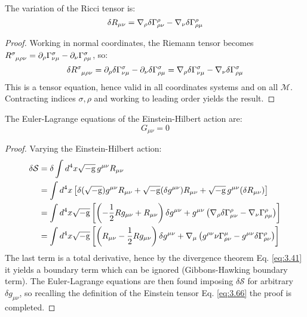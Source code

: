 \begin{lemma}
  The variation of the Ricci tensor is:
  \begin{equation}
    \delta R_{\mu \nu} = \nabla_\rho \delta \Gamma^\rho_{\rho \nu} - \nabla_\nu \delta \Gamma^\rho_{\rho \mu}
    \label{eq:4.4}
  \end{equation}
\end{lemma}
\begin{proof}
  Working in normal coordinates, the Riemann tensor becomes $ \tensor{R}{^\sigma_{\mu \rho \nu}} = \pa_\rho \Gamma^\sigma_{\nu \mu} - \pa_\nu \Gamma^\sigma_{\rho \mu} $, so:
  \begin{equation*}
    \delta \tensor{R}{^\sigma_{\mu \rho \nu}} = \pa_\rho \delta \Gamma^\sigma_{\nu \mu} - \pa_\nu \delta \Gamma^\sigma_{\rho \mu} = \na_\rho \delta \Gamma^\sigma_{\nu \mu} - \na_\nu \delta \Gamma^\sigma_{\rho \mu}
  \end{equation*}
  This is a tensor equation, hence valid in all coordinates systems and on all $ \mathcal{M} $. Contracting indices $ \sigma,\rho $ and working to leading order yields the result.
\end{proof}

\begin{proposition}\label{prop-einst-eq}
  The Euler-Lagrange equations of the Einstein-Hilbert action are:
  \begin{equation}
    G_{\mu \nu} = 0
    \label{eq:4.5}
  \end{equation}
\end{proposition}
\begin{proof}
  Varying the Einstein-Hilbert action:
  \begin{equation*}
    \begin{split}
      \delta \mathcal{S}
      &= \delta \int d^4 x \sqrt{-\mathrm{g}}\, g^{\mu \nu} R_{\mu \nu} \\
      &= \int d^4 x \left[ \delta (\sqrt{-\mathrm{g}}) g^{\mu \nu} R_{\mu \nu} + \sqrt{-\mathrm{g}} (\delta g^{\mu \nu}) R_{\mu \nu} + \sqrt{-\mathrm{g}}\, g^{\mu \nu} (\delta R_{\mu \nu}) \right] \\
      &= \int d^4 x \sqrt{-\mathrm{g}} \left[ \left( - \frac{1}{2} R g_{\mu \nu} + R_{\mu \nu} \right) \delta g^{\mu \nu} + g^{\mu \nu} \left( \nabla_\rho \delta \Gamma^\rho_{\mu \nu} - \nabla_\nu \Gamma^\rho_{\rho \mu} \right) \right] \\
      &= \int d^4 x \sqrt{-\mathrm{g}} \left[ \left( R_{\mu \nu} - \frac{1}{2} R g_{\mu \nu} \right) \delta g^{\mu \nu} + \nabla_\mu \left( g^{\rho \nu} \nu \Gamma^\mu_{\rho \nu} - g^{\mu \nu} \delta \Gamma^\rho_{\rho \nu} \right) \right]
    \end{split}
  \end{equation*}
  The last term is a total derivative, hence by the divergence theorem Eq. \ref{eq:3.41} it yields a boundary term which can be ignored (Gibbons-Hawking boundary term). The Euler-Lagrange equations are then found imposing $ \delta \mathcal{S} $ for arbitrary $ \delta g_{\mu \nu} $, so recalling the definition of the Einstein tensor Eq. \ref{eq:3.66} the proof is completed.
\end{proof}

